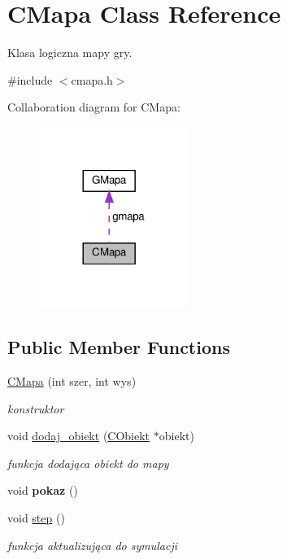 \hypertarget{class_c_mapa}{}\section{C\+Mapa Class Reference}
\label{class_c_mapa}


Klasa logiczna mapy gry.  




{\ttfamily \#include $<$cmapa.\+h$>$}



Collaboration diagram for C\+Mapa\+:\nopagebreak
\begin{figure}[H]
\begin{center}
\leavevmode
\includegraphics[width=137pt]{class_c_mapa__coll__graph}
\end{center}
\end{figure}
\subsection*{Public Member Functions}
\begin{DoxyCompactItemize}
\item 
\mbox{\hyperlink{class_c_mapa_a52d842556392c591fc35475ef6e2c497}{C\+Mapa}} (int szer, int wys)
\begin{DoxyCompactList}\small\item\em konstruktor \end{DoxyCompactList}\item 
void \mbox{\hyperlink{class_c_mapa_a52368cb5130167cf5a610b2d539a2fad}{dodaj\+\_\+obiekt}} (\mbox{\hyperlink{class_c_obiekt}{C\+Obiekt}} $\ast$obiekt)
\begin{DoxyCompactList}\small\item\em funkcja dodająca obiekt do mapy \end{DoxyCompactList}\item 
\mbox{\label{class_c_mapa_a60c1223c1f3cc31299b2a48699b7e6e1}} 
void {\bfseries pokaz} ()
\item 
void \mbox{\hyperlink{class_c_mapa_acbaf866a435bd4049da8d9432a482c61}{step}} ()
\begin{DoxyCompactList}\small\item\em funkcja aktualizująca do symulacji \end{DoxyCompactList}\end{DoxyCompactItemize}
